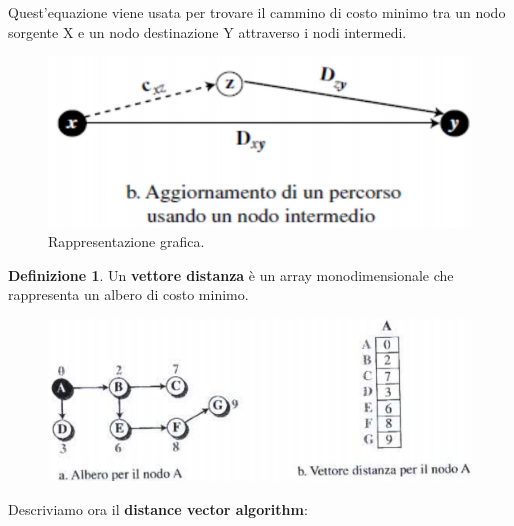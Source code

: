 \documentclass[11pt,a4paper,oneside]{book}
\theoremstyle{definition}
\newtheorem{definition}{Definizione}[section]
\begin{document}
Quest'equazione viene usata per trovare il cammino di costo minimo tra un nodo sorgente X e un nodo destinazione Y attraverso i nodi intermedi.

\begin{figure}[!h]
	\includegraphics[scale=0.25]{Immagini/Bell.png}
	\centering
	\caption{Rappresentazione grafica.}
\end{figure}

\theoremstyle{definition}
\begin{definition}
	Un \textbf{vettore distanza} è un array monodimensionale che rappresenta un albero di costo minimo.
\end{definition}

\begin{figure}[!h]
	\includegraphics[scale=0.25]{Immagini/Vect.png}
	\centering
\end{figure}

\pagebreak

Descriviamo ora il \textbf{distance vector algorithm}:
\end{document}
